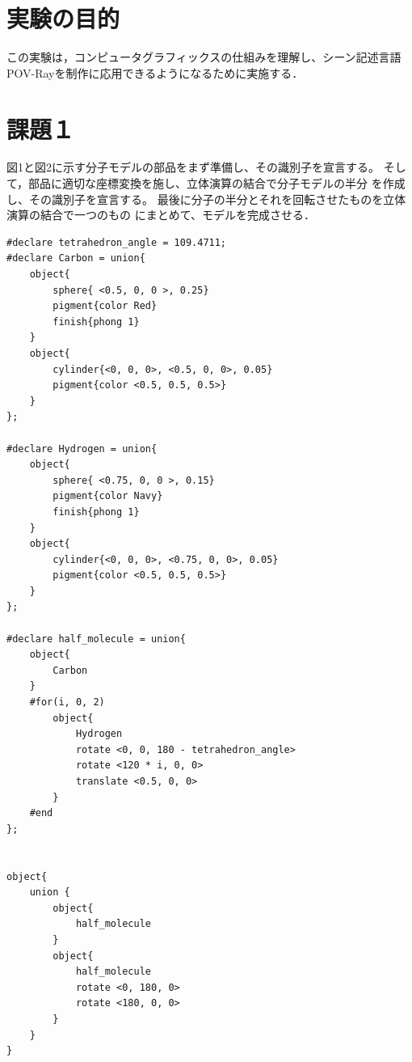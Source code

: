 \documentclass[a4j,dvipdfmx,uplatex,11pt]{jsarticle}
\author{亀井　大和} %
\begin{document}
 \maketitle
 

\tableofcontents 
 
\newpage 

\section{実験の目的}

この実験は，コンピュータグラフィックスの仕組みを理解し、シーン記述言語POV-Rayを制作に応用できるようになるために実施する．


\section{課題１}


図1と図2に示す分子モデルの部品をまず準備し、その識別子を宣言する。
そして，部品に適切な座標変換を施し、立体演算の結合で分子モデルの半分
を作成し、その識別子を宣言する。
最後に分子の半分とそれを回転させたものを立体演算の結合で一つのもの
にまとめて、モデルを完成させる．

\begin{lstlisting}[style=pov,mathescape=true,caption={課題１のソースコード}, label={src:example}]
#declare tetrahedron_angle = 109.4711;
#declare Carbon = union{
    object{
        sphere{ <0.5, 0, 0 >, 0.25} 
        pigment{color Red}
        finish{phong 1}
    }
    object{
        cylinder{<0, 0, 0>, <0.5, 0, 0>, 0.05}
        pigment{color <0.5, 0.5, 0.5>}
    }
};

#declare Hydrogen = union{
    object{
        sphere{ <0.75, 0, 0 >, 0.15}
        pigment{color Navy} 
        finish{phong 1}
    }
    object{
        cylinder{<0, 0, 0>, <0.75, 0, 0>, 0.05}
        pigment{color <0.5, 0.5, 0.5>}
    }
};

#declare half_molecule = union{
    object{
        Carbon
    }
    #for(i, 0, 2)
        object{
            Hydrogen
            rotate <0, 0, 180 - tetrahedron_angle>
            rotate <120 * i, 0, 0>
            translate <0.5, 0, 0>
        }
    #end
};


object{
    union {
        object{
            half_molecule
        }
        object{
            half_molecule
            rotate <0, 180, 0>
            rotate <180, 0, 0>
        }
    }
}


\end{lstlisting}
\end{document}
